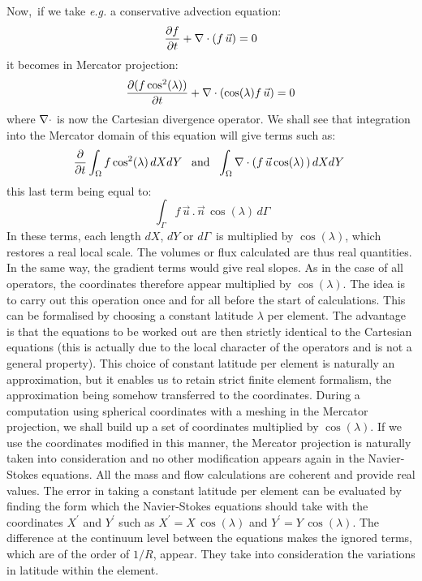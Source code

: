 Now,\ if we take \textit{e.g.} a conservative advection equation:%
\begin{equation}
  \dfrac{\partial f}{\partial t}+\nabla \cdot(f\,\vec{u})=0
\end{equation}
it becomes in Mercator projection:%
\begin{equation}
  \dfrac{\partial(f\cos^{2}(\lambda))}{\partial t}+\nabla \cdot(\cos(\lambda)f\,\vec{u})=0
\end{equation}
where $\nabla \cdot$ is now the Cartesian divergence operator.
We shall see that integration into the Mercator domain of this equation will
give terms such as:%
\[\dfrac{\partial}{\partial t}\int\nolimits_{\Omega}f\cos^{2}(\lambda
)\,dXdY\,\,\text{\thinspace\ and}\,\,\,\,\int\nolimits_{\Omega}\Div(f\,\vec
{u}\cos(\lambda)\,)\,dXdY\,\,\]
this last term being equal to:%
\[\,\int\nolimits_{\Gamma}f\,\vec{u}\,.\,\vec{n}\,\cos(\lambda)\,d\Gamma\]
In these terms, each length $dX$, $dY$ or $d\Gamma$\ is multiplied by
$\cos(\lambda)$, which restores a real local scale. The volumes or flux
calculated are thus real quantities. In the same way, the gradient terms would
give real slopes.
As in the case of all operators, the coordinates therefore appear multiplied
by $\cos(\lambda)$. The idea is to carry out this operation once and for all
before the start of calculations. This can be formalised by choosing a
constant latitude $\lambda$ per element. The advantage is that the equations
to be worked out are then strictly identical to the Cartesian equations (this
is actually due to the local character of the operators and is not a general
property). This choice of constant latitude per element is naturally an
approximation, but it enables us to retain strict finite element formalism,
the approximation being somehow transferred to the coordinates.
During a computation using spherical coordinates with a meshing in the
Mercator projection, we shall build up a set of coordinates multiplied by
$\cos(\lambda)$. If we use the coordinates modified in this manner, the
Mercator projection is naturally taken into consideration and no other
modification appears again in the Navier-Stokes equations. All the mass and
flow calculations are coherent and provide real values.
The error in taking a constant latitude per element can be evaluated by
finding the form which the Navier-Stokes equations should take with the
coordinates $X^{\prime}$ and $Y^{\prime}$ such as $X^{\prime}=X\,\cos
(\lambda)$ and $Y^{\prime}=Y\,\cos(\lambda)$. The difference at the continuum
level between the equations makes the ignored terms, which are of the order of
$1/R$, appear. They take into consideration the variations in latitude within
the element.

